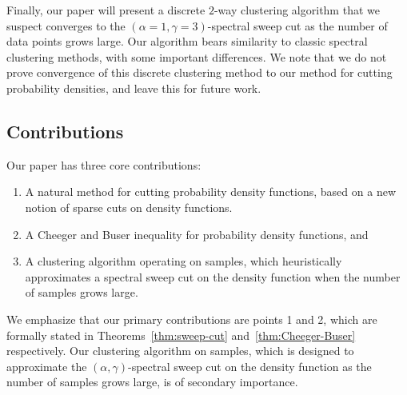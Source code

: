 Finally, our paper will present a discrete $2$-way clustering algorithm that we
suspect converges to the $(\alpha=1, \gamma=3)$-spectral sweep cut as the
number of data points grows large.  Our
algorithm bears similarity to classic
spectral clustering methods, with some important differences. We note
that we do not prove convergence of this discrete clustering method to
our method for cutting probability densities, and leave this for future work.


\subsection{Contributions}

Our paper has three core contributions: 
\begin{enumerate}
  \item A natural method for cutting probability density
    functions, based on a new notion of sparse cuts on density functions.
  \item A Cheeger and Buser inequality for probability density
    functions, and
  \item A clustering algorithm operating on samples, which heuristically
    approximates a spectral sweep cut on the density function when the
    number of samples grows large.
\end{enumerate}
We emphasize that our primary contributions are points 1 and 2, which
are formally stated in
Theorems~\ref{thm:sweep-cut} and~\ref{thm:Cheeger-Buser} respectively.  
Our clustering algorithm on samples, which is designed to approximate
the $(\alpha, \gamma)$-spectral sweep cut on the density function as the number of samples
grows large, is of secondary importance. 

